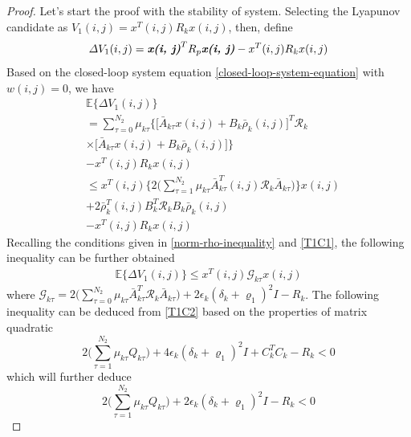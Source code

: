 \documentclass[journal,final,twocolumn]{IEEEtran}
\begin{document}
\begin{proof}
	Let's start the proof with the stability of system. Selecting the Lyapunov candidate as $V_{1}(i,j) = x^{T}(i,j)R_{k}x(i,j)$, then, define
	\begin{equation}\label{VAR-DELTA-V1}
	\varDelta V_{1}(i,j) = \emph{\textbf{x(i, j)}}^{T}R_{p}\emph{\textbf{x(i, j)}} - x^{T}(i,j)R_{k}x(i,j)
	\end{equation}
	Based on the closed-loop system equation \eqref{closed-loop-system-equation} with $w(i,j)=0$, we have 
	\begin{equation}
	\begin{split}
	&\mathbb{E}\{\varDelta V_{1}(i,j) \}\\
	&=  \sum_{\tau =0}^{N_{2}}\mu_{k\tau }\Big\{\big[\bar{A}_{k\tau }x(i,j)+B_{k}\bar{\rho}_{k}(i,j)\big]^{T}\mathcal{R}_{k}\\
	&\times\big[\bar{A}_{k\tau }x(i,j)+B_{k}\bar{\rho}_{k}(i,j)\big]\Big\}\\
	&- x^{T}(i,j)R_{k}x(i,j) \\
	&\leq x^{T}(i,j) \Big\{2\big(\sum_{\tau =1}^{N_{2}}\mu_{k\tau }\bar{A}^{T}_{k\tau }(i,j)\mathcal{R}_{k}\bar{A}_{k\tau }\big)\Big\}x(i,j)\\ &+2\bar{\rho}^{T}_{k}(i,j)B^{T}_{k}\mathcal{R}_{k}B_{k}\bar{\rho}_{k}(i,j) \\
	&-  x^{T}(i,j)R_{k}x(i,j)
	\end{split}
	\end{equation}
	Recalling the conditions given in \eqref{norm-rho-inequality} and \eqref{T1C1}, the following inequality can be further obtained
	\begin{equation}\label{combine-one-1}
	\begin{split}
		\mathbb{E}\{\varDelta  V_{1}(i,j) \} \leq x^{T}(i,j)\mathcal{G}_{k\tau }x(i,j)
	\end{split}
	\end{equation}
	where $\mathcal{G}_{k\tau }= 2\big(\sum_{\tau =0}^{N_{2}}\mu_{k\tau }\bar{A}^{T}_{k\tau }\mathcal{R}_{k}\bar{A}_{k\tau }\big)
	+ 2\epsilon_{k}(\delta_{k}+\varrho_{1})^{2}I- R_{k}$.
	The following inequality can be deduced from \eqref{T1C2} based on the properties of  matrix quadratic
	\begin{equation}
	2\big(\sum_{\tau =1}^{N_{2}}\mu_{k\tau }Q_{k\tau }\big)+4\epsilon_{k}(\delta_{k}+\varrho_{1})^{2}I+C^{T}_{k}C_{k}-R_{k} < 0
	\end{equation}
	which will further deduce
	\begin{equation}\label{combine-one-2}
			2\big(\sum_{\tau =1}^{N_{2}}\mu_{k\tau }Q_{k\tau }\big)+2\epsilon_{k}(\delta_{k}+\varrho_{1})^{2}I-R_{k} < 0

\end{equation}
\end{proof}
\end{document}
